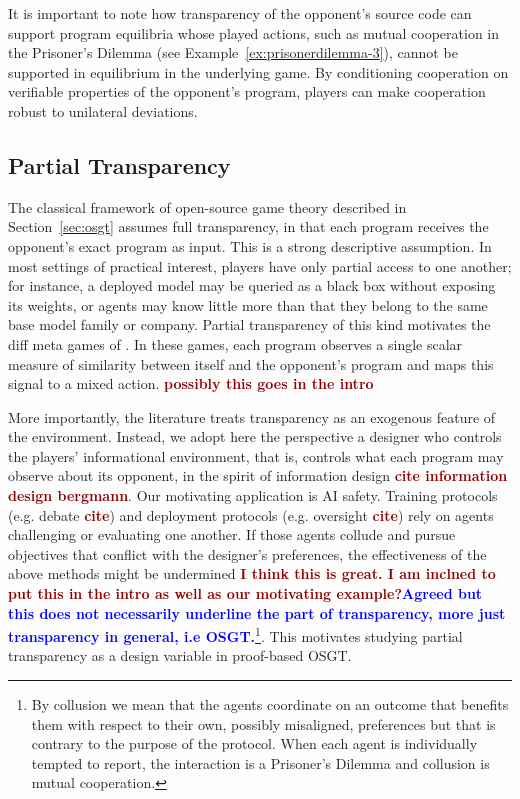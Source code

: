 \documentclass[twoside,11pt]{article}
\newcommand{\boldred}[1]{\textbf{\textcolor{darkred}{#1}}}
\newcommand{\boldblue}[1]{\textbf{\textcolor{blue}{#1}}}
\begin{document}
It is important to note how transparency of the opponent’s source code can support program equilibria whose played actions, such as mutual cooperation in the Prisoner’s Dilemma (see Example~\ref{ex:prisonerdilemma-3}), cannot be supported in equilibrium in the underlying game. By conditioning cooperation on verifiable properties of the opponent’s program, players can make cooperation robust to unilateral deviations. 

\subsection{Partial Transparency}

The classical framework of open-source game theory described in Section~\ref{sec:osgt} assumes full transparency, in that each program receives the opponent's exact program as input. This is a strong descriptive assumption. In most settings of practical interest, players have only partial access to one another; for instance, a deployed model may be queried as a black box without exposing its weights, or agents may know little more than that they belong to the same base model family or company. Partial transparency of this kind motivates the diff meta games of \cite{DBLP:conf/nips/OesterheldTGCF23}. In these games, each program observes a single scalar measure of similarity between itself and the opponent's program and maps this signal to a mixed action. \boldred{possibly this goes in the intro}

More importantly, the literature treats transparency as an exogenous feature of the environment. Instead, we adopt here the perspective a designer who controls the players' informational environment, that is, controls what each program may observe about its opponent, in the spirit of information design \boldred{cite information design bergmann}. Our motivating application is AI safety. Training protocols (e.g. debate \boldred{cite}) and deployment protocols (e.g. oversight \boldred{cite}) rely on agents challenging or evaluating one another. If those agents collude and pursue objectives that conflict with the designer's preferences, the effectiveness of the above methods might be undermined \boldred{I think this is great. I am inclned to put this in the intro as well as our motivating example?}\boldblue{Agreed but this does not necessarily underline the \endquote{partial} part of transparency, more just transparency in general, i.e OSGT.}\footnote{By collusion we mean that the agents coordinate on an outcome that benefits them with respect to their own, possibly misaligned, preferences but that is contrary to the purpose of the protocol.  When each agent is individually tempted to report, the interaction is a Prisoner's Dilemma and collusion is mutual cooperation.}. This motivates studying partial transparency as a design variable in proof-based OSGT.
\end{document}
